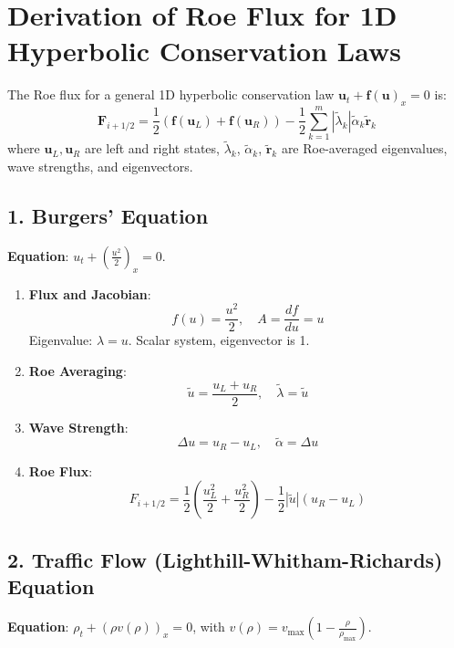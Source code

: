 \documentclass[12pt]{article}
\begin{document}
\section*{Derivation of Roe Flux for 1D Hyperbolic Conservation Laws}

The Roe flux for a general 1D hyperbolic conservation law \(\mathbf{u}_t + \mathbf{f}(\mathbf{u})_x = 0\) is:
\[
\mathbf{F}_{i+1/2} = \frac{1}{2} \left( \mathbf{f}(\mathbf{u}_L) + \mathbf{f}(\mathbf{u}_R) \right) - \frac{1}{2} \sum_{k=1}^m |\tilde{\lambda}_k| \tilde{\alpha}_k \tilde{\mathbf{r}}_k
\]
where \(\mathbf{u}_L, \mathbf{u}_R\) are left and right states, \(\tilde{\lambda}_k\), \(\tilde{\alpha}_k\), \(\tilde{\mathbf{r}}_k\) are Roe-averaged eigenvalues, wave strengths, and eigenvectors.

\subsection*{1. Burgers' Equation}
\textbf{Equation}: \( u_t + \left( \frac{u^2}{2} \right)_x = 0 \).

\begin{enumerate}
    \item \textbf{Flux and Jacobian}:
    \[
    f(u) = \frac{u^2}{2}, \quad A = \frac{df}{du} = u
    \]
    Eigenvalue: \(\lambda = u\). Scalar system, eigenvector is 1.

    \item \textbf{Roe Averaging}:
    \[
    \tilde{u} = \frac{u_L + u_R}{2}, \quad \tilde{\lambda} = \tilde{u}
    \]

    \item \textbf{Wave Strength}:
    \[
    \Delta u = u_R - u_L, \quad \tilde{\alpha} = \Delta u
    \]

    \item \textbf{Roe Flux}:
    \[
    F_{i+1/2} = \frac{1}{2} \left( \frac{u_L^2}{2} + \frac{u_R^2}{2} \right) - \frac{1}{2} |\tilde{u}| (u_R - u_L)
    \]
\end{enumerate}

\subsection*{2. Traffic Flow (Lighthill-Whitham-Richards) Equation}
\textbf{Equation}: \(\rho_t + \left( \rho v(\rho) \right)_x = 0\), with \( v(\rho) = v_{\text{max}} \left(1 - \frac{\rho}{\rho_{\text{max}}}\right) \).
\end{document}
